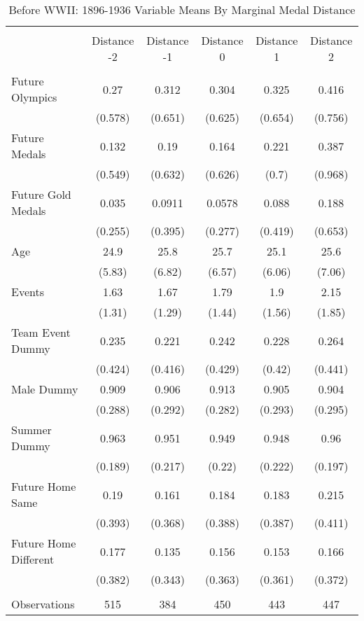 
\begin{table}[!htbp] \centering 
  \renewcommand\thetable{A1}
  \caption{Before WWII: 1896-1936 Variable Means By Marginal Medal Distance} 
  \label{} 
\small 
\begin{tabular}{@{\extracolsep{5pt}} lccccc} 
\\[-1.8ex]\hline \\[-1.8ex] 
 & Distance -2 & Distance -1 & Distance 0 & Distance 1 & Distance 2 \\ 
\hline 
\hline \\[-1.8ex] 
Future Olympics & 0.27 & 0.312 & 0.304 & 0.325 & 0.416 \\ 
 & (0.578) & (0.651) & (0.625) & (0.654) & (0.756) \\ 
Future Medals & 0.132 & 0.19 & 0.164 & 0.221 & 0.387 \\ 
  & (0.549) & (0.632) & (0.626) & (0.7) & (0.968) \\ 
Future Gold Medals & 0.035 & 0.0911 & 0.0578 & 0.088 & 0.188 \\ 
   & (0.255) & (0.395) & (0.277) & (0.419) & (0.653) \\ 
Age & 24.9 & 25.8 & 25.7 & 25.1 & 25.6 \\ 
    & (5.83) & (6.82) & (6.57) & (6.06) & (7.06) \\ 
Events & 1.63 & 1.67 & 1.79 & 1.9 & 2.15 \\ 
     & (1.31) & (1.29) & (1.44) & (1.56) & (1.85) \\ 
Team Event Dummy & 0.235 & 0.221 & 0.242 & 0.228 & 0.264 \\ 
      & (0.424) & (0.416) & (0.429) & (0.42) & (0.441) \\ 
Male Dummy & 0.909 & 0.906 & 0.913 & 0.905 & 0.904 \\ 
       & (0.288) & (0.292) & (0.282) & (0.293) & (0.295) \\ 
Summer Dummy & 0.963 & 0.951 & 0.949 & 0.948 & 0.96 \\ 
        & (0.189) & (0.217) & (0.22) & (0.222) & (0.197) \\ 
Future Home Same & 0.19 & 0.161 & 0.184 & 0.183 & 0.215 \\ 
         & (0.393) & (0.368) & (0.388) & (0.387) & (0.411) \\ 
Future Home Different & 0.177 & 0.135 & 0.156 & 0.153 & 0.166 \\ 
          & (0.382) & (0.343) & (0.363) & (0.361) & (0.372) \\ 
           &  &  &  &  &  \\ 
Observations & 515 & 384 & 450 & 443 & 447 \\ 

\end{tabular}
\end{table}
